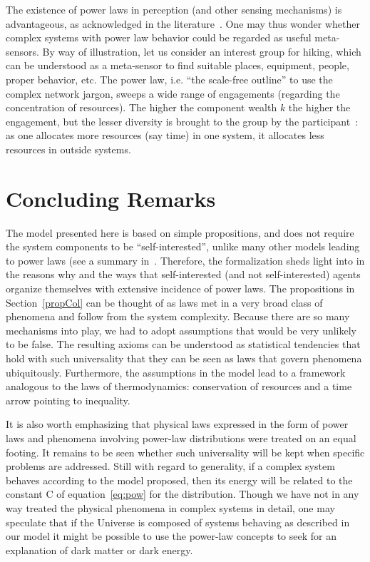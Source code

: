 \documentclass[10pt,letterpaper]{article}
\begin{document}
The existence of power laws in perception (and other sensing mechanisms) is advantageous, as acknowledged in the literature~\cite{psycho}. One may thus wonder whether complex systems with power law behavior could be regarded as useful meta-sensors. By way of illustration, let us consider an interest group for hiking, which can be understood as a meta-sensor to find suitable 
places, equipment, people, proper behavior, etc.
The power law, i.e. ``the scale-free outline'' to use
the complex network jargon, sweeps a wide range of engagements (regarding the concentration of resources).
The higher the component wealth $k$ the higher the engagement,
but the lesser diversity is brought to the group
by the participant~\cite{tStable}: as one allocates more resources (say time) in one system, it allocates less resources in outside systems.

\section{Concluding Remarks}
The model presented here is based on simple propositions, and does not require the system components to be ``self-interested'',
unlike many other models leading to power laws (see a summary in~\cite{newmanpower,part}. Therefore, the formalization sheds light into in the reasons why and the ways that self-interested (and not self-interested) agents organize themselves with extensive incidence of power laws. The propositions in Section~\ref{propCol} can be thought of as laws met in a very broad class of phenomena and follow from the system complexity. Because there are so many mechanisms into play, we had to adopt assumptions that would be very unlikely to be false. The resulting axioms can be understood as statistical tendencies that hold with such universality that they can be seen as laws that govern phenomena ubiquitously. 
Furthermore, the assumptions in the model lead to a framework analogous to the laws of thermodynamics:
conservation of resources and a time arrow pointing to inequality.

It is also worth emphasizing that physical laws expressed in the form of power laws and phenomena involving power-law distributions were treated on an equal footing. It remains to be seen whether such universality will be kept when specific problems are addressed. Still with regard to generality, if a complex system behaves according to the model proposed, then its energy will be related to the constant C of equation~\ref{eq:pow} for the distribution. Though we have not in any way treated the physical phenomena in complex systems in detail, one may speculate that if the Universe is composed of systems behaving as described in our model it might be possible to use the power-law concepts to seek for an explanation of dark matter or dark energy. 
\end{document}
